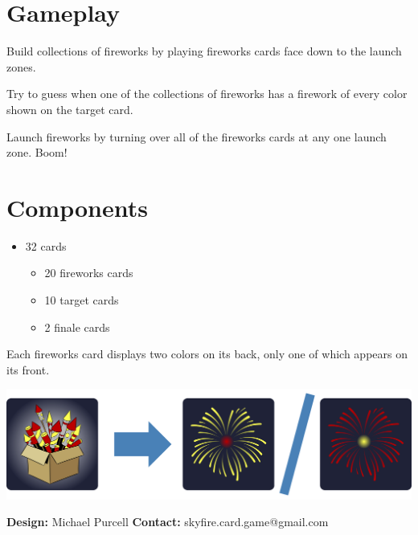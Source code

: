 \documentclass[a5paper, DIV=18, 12pt]{scrartcl}
\begin{document}
\begin{multicols}{2}
\section*{\textcolor{SunriseBlue}{Gameplay}}
Build collections of fireworks by playing fireworks cards face down to the launch zones.

\vspace{2ex}

Try to guess when one of the collections of fireworks has a firework of every color shown on the target card.

\vspace{2ex}

Launch fireworks by turning over all of the fireworks cards at any one launch zone. Boom!
 \vfill\null\columnbreak

\section*{\textcolor{SunriseBlue}{Components}}
\begin{itemize}[nosep, leftmargin=*]
\item 32 cards
	\vspace{0.5ex}
\begin{itemize}[nosep, leftmargin=*]
	\item 20 fireworks cards
	\vspace{0.5ex}
	\item 10 target cards
	\vspace{0.5ex}
	\item 2 finale cards
\end{itemize}
\end{itemize}

\vspace{1ex}

Each fireworks card displays two colors on its back, only one of which appears on its front.

\vspace{-1ex}

\begin{center}
\includegraphics[width=\columnwidth]{Images/sell_sheet_diagram2a.png}
\end{center}
\phantom{a}
\end{multicols}

%
\vspace{-4ex}
\textbf{Design:} Michael Purcell \hfill \textbf{Contact:} skyfire.card.game@gmail.com
\end{document}
